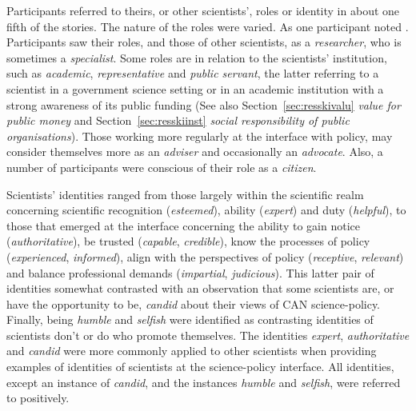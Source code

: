 Participants referred to theirs, or other scientists', roles or identity in about one fifth of the stories. The nature of the roles were varied. As one participant noted . Participants saw their roles, and those of other scientists, as a \emph{researcher}, who is sometimes a \emph{specialist}. Some roles are in relation to the scientists' institution, such as \emph{academic}, \emph{representative} and \emph{public servant}, the latter referring to a scientist in a government science setting or in an academic institution with a strong awareness of its public funding (See also Section~\ref{sec:resskivalu} \emph{value for public money} and Section~\ref{sec:resskiinst} \emph{social responsibility of public organisations}). Those working more regularly at the interface with policy, may consider themselves more as an \emph{adviser} and occasionally an \emph{advocate}. Also, a number of participants were conscious of their role as a \emph{citizen}.

Scientists' identities ranged from those largely within the scientific realm concerning scientific recognition (\emph{esteemed}), ability (\emph{expert}) and duty (\emph{helpful}), to those that emerged at the interface concerning the ability to gain notice (\emph{authoritative}), be trusted (\emph{capable}, \emph{credible}), know the processes of policy (\emph{experienced}, \emph{informed}), align with the perspectives of policy (\emph{receptive}, \emph{relevant}) and balance professional demands (\emph{impartial}, \emph{judicious}). This latter pair of identities somewhat contrasted with an observation that some scientists are, or have the opportunity to be, \emph{candid} about their views of CAN science-policy. Finally, being \emph{humble} and \emph{selfish} were identified as contrasting identities of scientists don't or do who promote themselves. The identities \emph{expert}, \emph{authoritative} and \emph{candid} were more commonly applied to other scientists when providing examples of identities of scientists at the science-policy interface. All identities, except an instance of \emph{candid}, and the instances \emph{humble} and \emph{selfish}, were referred to positively.

